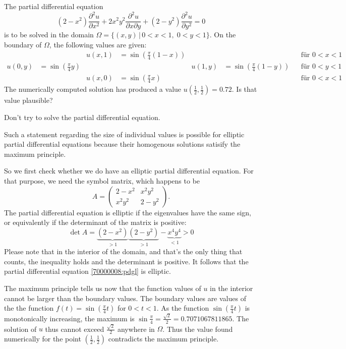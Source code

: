The partial differential equation
\begin{equation}
(2-x^2)\frac{\partial^2 u}{\partial x^2}
+
2x^2y^2\frac{\partial^2 u}{\partial x\partial y}
+
(2-y^2)\frac{\partial^2 u}{\partial y^2}
=0
\label{70000008:pdgl}
\end{equation}
is to be solved in the domain
$\Omega=\{(x,y)\,|\, 0< x<1,\; 0<y<1\}$.
On the boundary of $\Omega$, the following values are given:
\begin{align*}
&
	&u(x,1)&=\sin({\textstyle\frac\pi4}(1-x))
		&&
			&&\text{für $0<x<1$}\\
u(0,y)&=\sin({\textstyle\frac\pi4}y)
	&&
		&u(1,y)&=\sin({\textstyle\frac\pi4}(1-y))
			&&\text{für $0<y<1$}\\
&
	&u(x,0)&=\sin({\textstyle\frac\pi4} x)
		&&                
			&&\text{für $0<x<1$}
\end{align*}
The numerically computed solution has produced a value
$u(\frac12,\frac12)=0.72$.
Is that value plausible?

\begin{hinweis}
Don't try to solve the partial differential equation.
\end{hinweis}

\begin{loesung}
Such a statement regarding the size of individual values is possible
for elliptic partial differential equations because their homogenous
solutions satisify the maximum principle.

So we first check whether we do have an elliptic partial differential
equation.
For that purpose, we need the symbol matrix, which happens to be
\[
A=\begin{pmatrix}
2-x^2 &x^2y^2\\
x^2y^2&2-y^2
\end{pmatrix}.
\]
The partial differential equation is elliptic if the eigenvalues
have the same sign, or equivalently if the determinant of the matrix
is positive:
\[
\det A=\underbrace{(2-x^2)}_{> 1}\underbrace{(2-y^2)}_{> 1}-\underbrace{x^4y^4}_{< 1}>0
\]
Please note that in the interior of the domain, and that's the only
thing that counts, the inequality holds and the determinant is
positive.
It follows that the partial differential equation
\eqref{70000008:pdgl} is elliptic.

The maximum principle tells us now that the function values of $u$
in the interior cannot be larger than the boundary values.
The boundary values are values of the the function
$f(t)=\sin(\frac\pi4t)$ for $0<t<1$.
As the function
$\sin(\frac\pi4t)$ is monotonically increasing, the maximum
is $\sin\frac\pi4=\frac{\sqrt{2}}2=0.7071067811865$.
The solution of $u$ thus cannot exceed 
$\frac{\sqrt{2}}2$ anywhere in $\Omega$.
Thus the value found numerically for the point
$(\frac12,\frac12)$ contradicts the maximum principle.
\end{loesung}

